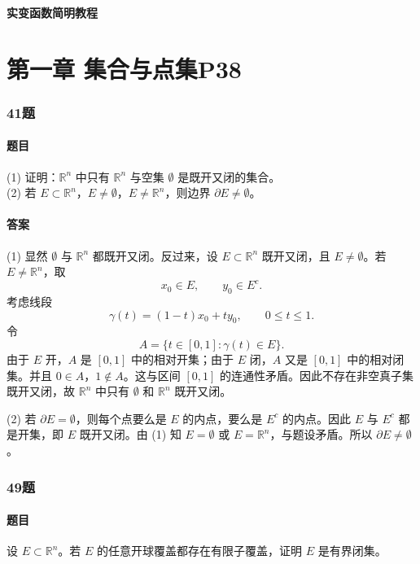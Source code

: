 \documentclass{article}
\begin{document}
	\newpage
	
	\begin{center}
		{\Large \textbf{实变函数简明教程}}\\[0.3cm]
	\end{center}
	
	\section*{第一章 \quad 集合与点集\quad P38}
	
	\subsubsection*{41题}
	\paragraph{题目} (1) 证明：$\mathbb{R}^n$ 中只有 $\mathbb{R}^n$ 与空集 $\emptyset$ 是既开又闭的集合。\\
	(2) 若 $E\subset\mathbb{R}^n$，$E\neq\emptyset$，$E\neq\mathbb{R}^n$，则边界 $\partial E\neq\emptyset$。
	
	\paragraph{答案} (1) 显然 $\emptyset$ 与 $\mathbb{R}^n$ 都既开又闭。反过来，设 $E\subset\mathbb{R}^n$ 既开又闭，且 $E\neq\emptyset$。若 $E\neq\mathbb{R}^n$，取
	\[
	x_0\in E,\qquad y_0\in E^c.
	\]
	考虑线段
	\[
	\gamma(t)=(1-t)x_0+ty_0,\qquad 0\le t\le 1.
	\]
	令
	\[
	A=\{t\in[0,1]:\gamma(t)\in E\}.
	\]
	由于 $E$ 开，$A$ 是 $[0,1]$ 中的相对开集；由于 $E$ 闭，$A$ 又是 $[0,1]$ 中的相对闭集。并且 $0\in A$，$1\notin A$。这与区间 $[0,1]$ 的连通性矛盾。因此不存在非空真子集既开又闭，故 $\mathbb{R}^n$ 中只有 $\emptyset$ 和 $\mathbb{R}^n$ 既开又闭。
	
	(2) 若 $\partial E=\emptyset$，则每个点要么是 $E$ 的内点，要么是 $E^c$ 的内点。因此 $E$ 与 $E^c$ 都是开集，即 $E$ 既开又闭。由 (1) 知 $E=\emptyset$ 或 $E=\mathbb{R}^n$，与题设矛盾。所以 $\partial E\neq\emptyset$。
	
	\subsubsection*{49题}
	\paragraph{题目} 设 $E\subset\mathbb{R}^n$。若 $E$ 的任意开球覆盖都存在有限子覆盖，证明 $E$ 是有界闭集。
	
\end{document}
